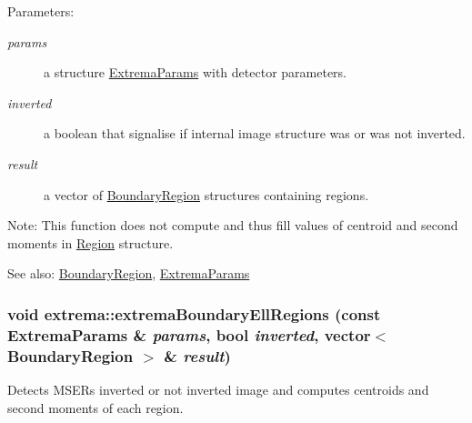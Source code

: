 \begin{Desc}
\item[Parameters:]
\begin{description}
\item[{\em params}]a structure \hyperlink{structextrema_1_1ExtremaParams}{Extrema\-Params} with detector parameters. \item[{\em inverted}]a boolean that signalise if internal image structure was or was not inverted. \item[{\em result}]a vector of \hyperlink{structextrema_1_1BoundaryRegion}{Boundary\-Region} structures containing regions.\end{description}
\end{Desc}
\begin{Desc}
\item[Note:]This function does not compute and thus fill values of centroid and second moments in \hyperlink{structextrema_1_1Region}{Region} structure. \end{Desc}
\begin{Desc}
\item[See also:]\hyperlink{structextrema_1_1BoundaryRegion}{Boundary\-Region}, \hyperlink{structextrema_1_1ExtremaParams}{Extrema\-Params} \end{Desc}
\hypertarget{namespaceextrema_9fa30526dfadd23b9730cb38c5e4ef88}{
\subsubsection[extremaBoundaryEllRegions]{\setlength{\rightskip}{0pt plus 5cm}void extrema::extrema\-Boundary\-Ell\-Regions (const Extrema\-Params \& {\em params}, bool {\em inverted}, vector$<$ Boundary\-Region $>$ \& {\em result})}}
\label{namespaceextrema_9fa30526dfadd23b9730cb38c5e4ef88}


Detects MSERs inverted or not inverted image and computes centroids and second moments of each region. 

